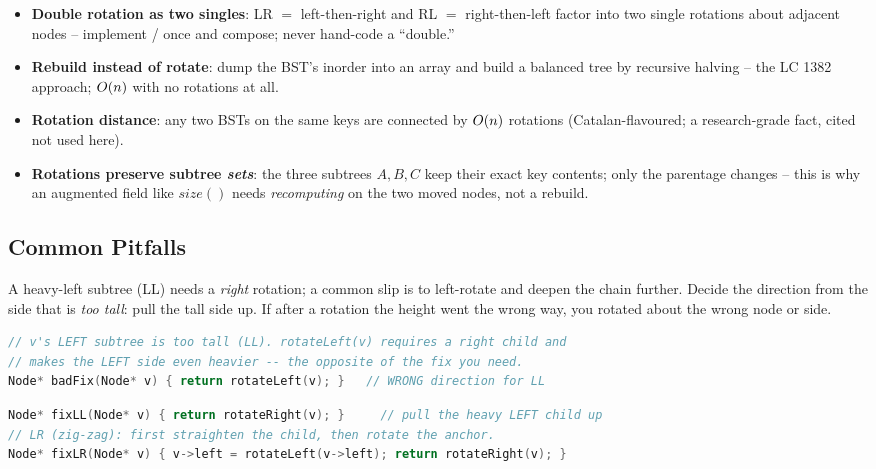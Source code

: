 \begin{itemize}[nosep]
  \item \textbf{Double rotation as two singles}: LR $=$ left-then-right and RL $=$ right-then-left
        factor into two single rotations about adjacent nodes -- implement  /
         once and compose; never hand-code a ``double.'' \hfill{}
  \item \textbf{Rebuild instead of rotate}: dump the BST's inorder into an array and build a balanced
        tree by recursive halving -- the LC 1382 approach; $O(n)$ with no rotations at all.
        \hfill{}
  \item \textbf{Rotation distance}: any two BSTs on the same keys are connected by $O(n)$
        rotations (Catalan-flavoured; a research-grade fact, cited not used here). \hfill{}
  \item \textbf{Rotations preserve subtree \emph{sets}}: the three subtrees $A,B,C$ keep their exact
        key contents; only the parentage changes -- this is why an augmented field like
        $\mathit{size}()$ needs \emph{recomputing} on the two moved nodes, not a rebuild. \hfill{}
\end{itemize}

\subsection{Common Pitfalls}\label{sec:c06-rotations-pitfalls}

\begin{warningbox}
A heavy-left subtree (LL) needs a \emph{right} rotation; a common slip is to left-rotate and deepen
the chain further. Decide the direction from the side that is \emph{too tall}: pull the tall side up.
If after a rotation the height went the wrong way, you rotated about the wrong node or side.
\end{warningbox}
\begin{lstlisting}[caption={\textcolor{warningred}{WRONG}: left-rotate an LL (heavy-left) node -- deepens the left chain}, language=C++, basicstyle=\ttfamily\small]
// v's LEFT subtree is too tall (LL). rotateLeft(v) requires a right child and
// makes the LEFT side even heavier -- the opposite of the fix you need.
Node* badFix(Node* v) { return rotateLeft(v); }   // WRONG direction for LL
\end{lstlisting}
\begin{lstlisting}[caption={\textcolor{successgreen}{RIGHT}: LL is repaired by one right rotation about the anchor}, language=C++, basicstyle=\ttfamily\small]
Node* fixLL(Node* v) { return rotateRight(v); }     // pull the heavy LEFT child up
// LR (zig-zag): first straighten the child, then rotate the anchor.
Node* fixLR(Node* v) { v->left = rotateLeft(v->left); return rotateRight(v); }
\end{lstlisting}


